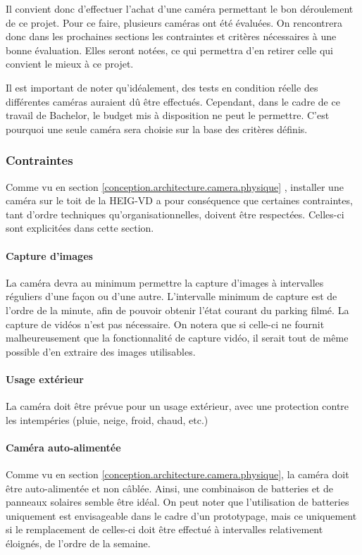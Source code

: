 Il convient donc d'effectuer l'achat d'une caméra permettant le bon déroulement de ce projet. Pour ce faire, plusieurs caméras ont été évaluées. On rencontrera donc dans les prochaines sections les contraintes et critères nécessaires à une bonne évaluation. Elles seront notées, ce qui permettra d'en retirer celle qui convient le mieux à ce projet.

Il est important de noter qu'idéalement, des tests en condition réelle des différentes caméras auraient dû être effectués. Cependant, dans le cadre de ce travail de Bachelor, le budget mis à disposition ne peut le permettre. C'est pourquoi une seule caméra sera choisie sur la base des critères définis.

\subsubsection{Contraintes}\label{conception.techno.camera.contraintes}
Comme vu en section \ref{conception.architecture.camera.physique} , installer une caméra sur le toit de la HEIG-VD a pour conséquence que certaines contraintes, tant d'ordre techniques qu'organisationnelles, doivent être respectées. Celles-ci sont explicitées dans cette section.

\paragraph{Capture d'images}
La caméra devra au minimum permettre la capture d'images à intervalles réguliers d'une façon ou d'une autre. L'intervalle minimum de capture est de l'ordre de la minute, afin de pouvoir obtenir l'état courant du parking filmé. La capture de vidéos n'est pas nécessaire. On notera que si celle-ci ne fournit malheureusement que la fonctionnalité de capture vidéo, il serait tout de même possible d'en extraire des images utilisables. 

\paragraph{Usage extérieur}
La caméra doit être prévue pour un usage extérieur, avec une protection contre les intempéries (pluie, neige, froid, chaud, etc.)

\paragraph{Caméra auto-alimentée}
Comme vu en section \ref{conception.architecture.camera.physique}, la caméra doit être auto-alimentée et non câblée. Ainsi, une combinaison de batteries et de panneaux solaires semble être idéal. On peut noter que l'utilisation de batteries uniquement est envisageable dans le cadre d'un prototypage, mais ce uniquement si le remplacement de celles-ci doit être effectué à intervalles relativement éloignés, de l'ordre de la semaine.

